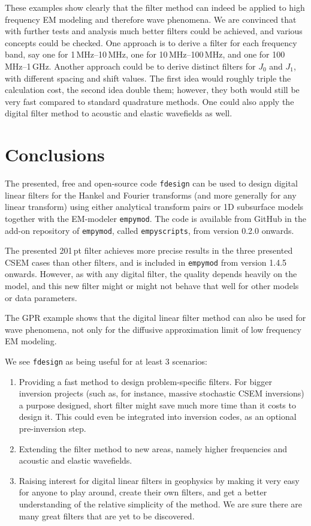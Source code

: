 \documentclass[paper,twocolumn,twoside]{geophysics}
\begin{document}
These examples show clearly that the filter method can indeed be applied to
high frequency EM modeling and therefore wave phenomena. We are convinced that
with further tests and analysis much better filters could be achieved, and
various concepts could be checked. One approach is to derive a filter for each
frequency band, say one for 1\,MHz--10\,MHz, one for 10\,MHz--100\,MHz, and one
for 100\,MHz--1\,GHz. Another approach could be to derive distinct filters for
$J_0$ and $J_1$, with different spacing and shift values. The first idea would
roughly triple the calculation cost, the second idea double them; however, they
both would still be very fast compared to standard quadrature methods. One
could also apply the digital filter method to acoustic and elastic wavefields
as well.

\section{Conclusions}

The presented, free and open-source code \texttt{fdesign} can be used to design
digital linear filters for the Hankel and Fourier transforms (and more
generally for any linear transform) using either analytical transform pairs or
1D subsurface models together with the EM-modeler \texttt{empymod}. The code is
available from GitHub in the add-on repository of \texttt{empymod}, called
\texttt{empyscripts}, from version 0.2.0 onwards.

The presented 201\,pt filter achieves more precise results in the three
presented CSEM cases than other filters, and is included in \texttt{empymod}
from version 1.4.5 onwards. However, as with any digital filter, the quality
depends heavily on the model, and this new filter might or might not behave
that well for other models or data parameters.

The GPR example shows that the digital linear filter method can also be used
for wave phenomena, not only for the diffusive approximation limit of low
frequency EM modeling.

We see \texttt{fdesign} as being useful for at least 3 scenarios:
\begin{enumerate}
  \item Providing a fast method to design problem-specific filters. For bigger
    inversion projects (such as, for instance, massive stochastic CSEM
    inversions) a purpose designed, short filter might save much more time than
    it costs to design it. This could even be integrated into inversion codes,
    as an optional pre-inversion step.
  \item Extending the filter method to new areas, namely higher frequencies and
    acoustic and elastic wavefields.
  \item Raising  interest for digital linear filters in geophysics by making it
    very easy for anyone to play around, create their own filters, and get a
    better understanding of the relative simplicity of the method. We are sure
    there are many great filters that are yet to be discovered.
\end{enumerate}
\end{document}
